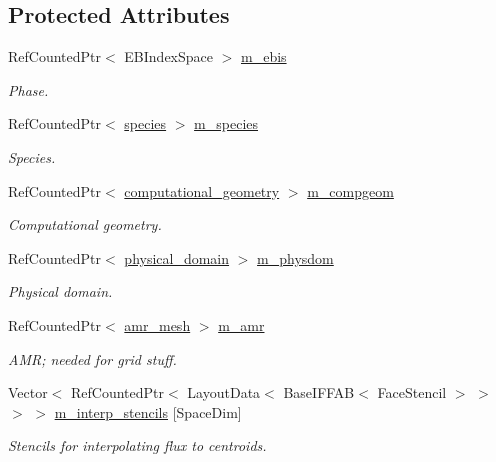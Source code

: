 \subsection*{Protected Attributes}
\begin{DoxyCompactItemize}
\item 
Ref\+Counted\+Ptr$<$ E\+B\+Index\+Space $>$ \hyperlink{classcdr__solver_a9c7cd91e565825df73dc595275f0b76c}{m\+\_\+ebis}
\begin{DoxyCompactList}\small\item\em Phase. \end{DoxyCompactList}\item 
Ref\+Counted\+Ptr$<$ \hyperlink{classspecies}{species} $>$ \hyperlink{classcdr__solver_ab340e99bc02a8f2ad3ef616077348e85}{m\+\_\+species}
\begin{DoxyCompactList}\small\item\em Species. \end{DoxyCompactList}\item 
Ref\+Counted\+Ptr$<$ \hyperlink{classcomputational__geometry}{computational\+\_\+geometry} $>$ \hyperlink{classcdr__solver_a61334675e5db1870fa94f7e2e0882af9}{m\+\_\+compgeom}
\begin{DoxyCompactList}\small\item\em Computational geometry. \end{DoxyCompactList}\item 
Ref\+Counted\+Ptr$<$ \hyperlink{classphysical__domain}{physical\+\_\+domain} $>$ \hyperlink{classcdr__solver_acbb78d3dc39ac7ed13be76611b0b0619}{m\+\_\+physdom}
\begin{DoxyCompactList}\small\item\em Physical domain. \end{DoxyCompactList}\item 
Ref\+Counted\+Ptr$<$ \hyperlink{classamr__mesh}{amr\+\_\+mesh} $>$ \hyperlink{classcdr__solver_a7cd8758087cf4bb1dcc1d46db731ea66}{m\+\_\+amr}
\begin{DoxyCompactList}\small\item\em A\+MR; needed for grid stuff. \end{DoxyCompactList}\item 
Vector$<$ Ref\+Counted\+Ptr$<$ Layout\+Data$<$ Base\+I\+F\+F\+AB$<$ Face\+Stencil $>$ $>$ $>$ $>$ \hyperlink{classcdr__solver_a5066d2efe4c78ce733c041b7a7284cf6}{m\+\_\+interp\+\_\+stencils} \mbox{[}Space\+Dim\mbox{]}
\begin{DoxyCompactList}\small\item\em Stencils for interpolating flux to centroids. \end{DoxyCompactList}\item 

\end{DoxyCompactItemize}
